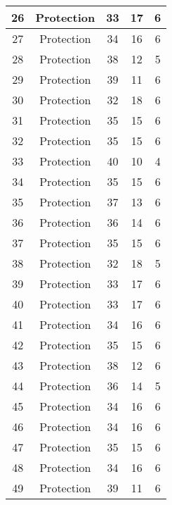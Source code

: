 \documentclass[results.tex]{subfiles}
\begin{document}
\begin{center}
\begin{tabular}{| c || c | c | c | c |}
    \hline
    26 & Protection & 33 & 17 & 6 \\ 
    \hline
    27 & Protection & 34 & 16 & 6 \\ 
    \hline
    28 & Protection & 38 & 12 & 5 \\ 
    \hline
    29 & Protection & 39 & 11 & 6 \\ 
    \hline
    30 & Protection & 32 & 18 & 6 \\ 
    \hline
    31 & Protection & 35 & 15 & 6 \\ 
    \hline
    32 & Protection & 35 & 15 & 6 \\ 
    \hline
    33 & Protection & 40 & 10 & 4 \\ 
    \hline
    34 & Protection & 35 & 15 & 6 \\ 
    \hline
    35 & Protection & 37 & 13 & 6 \\ 
    \hline
    36 & Protection & 36 & 14 & 6 \\ 
    \hline
    37 & Protection & 35 & 15 & 6 \\ 
    \hline
    38 & Protection & 32 & 18 & 5 \\ 
    \hline
    39 & Protection & 33 & 17 & 6 \\ 
    \hline
    40 & Protection & 33 & 17 & 6 \\ 
    \hline
    41 & Protection & 34 & 16 & 6 \\ 
    \hline
    42 & Protection & 35 & 15 & 6 \\ 
    \hline
    43 & Protection & 38 & 12 & 6 \\ 
    \hline
    44 & Protection & 36 & 14 & 5 \\ 
    \hline
    45 & Protection & 34 & 16 & 6 \\ 
    \hline
    46 & Protection & 34 & 16 & 6 \\ 
    \hline
    47 & Protection & 35 & 15 & 6 \\ 
    \hline
    48 & Protection & 34 & 16 & 6 \\ 
    \hline
    49 & Protection & 39 & 11 & 6 \\ 
    \hline   \end{tabular}
\end{center}
\end{document}
